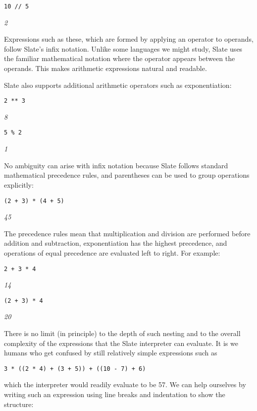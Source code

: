 \begin{lstlisting}
10 // 5
\end{lstlisting}
\textit{2}

Expressions such as these, which are formed by applying an operator to operands, follow Slate's infix notation. Unlike some languages we might study, Slate uses the familiar mathematical notation where the operator appears between the operands. This makes arithmetic expressions natural and readable.

Slate also supports additional arithmetic operators such as exponentiation:

\begin{lstlisting}
2 ** 3
\end{lstlisting}
\textit{8}

\begin{lstlisting}
5 % 2
\end{lstlisting}
\textit{1}

No ambiguity can arise with infix notation because Slate follows standard mathematical precedence rules, and parentheses can be used to group operations explicitly:

\begin{lstlisting}
(2 + 3) * (4 + 5)
\end{lstlisting}
\textit{45}

The precedence rules mean that multiplication and division are performed before addition and subtraction, exponentiation has the highest precedence, and operations of equal precedence are evaluated left to right. For example:

\begin{lstlisting}
2 + 3 * 4
\end{lstlisting}
\textit{14}

\begin{lstlisting}
(2 + 3) * 4
\end{lstlisting}
\textit{20}

There is no limit (in principle) to the depth of such nesting and to the overall complexity of the expressions that the Slate interpreter can evaluate. It is we humans who get confused by still relatively simple expressions such as

\begin{lstlisting}
3 * ((2 * 4) + (3 + 5)) + ((10 - 7) + 6)
\end{lstlisting}

which the interpreter would readily evaluate to be 57. We can help ourselves by writing such an expression using line breaks and indentation to show the structure:

